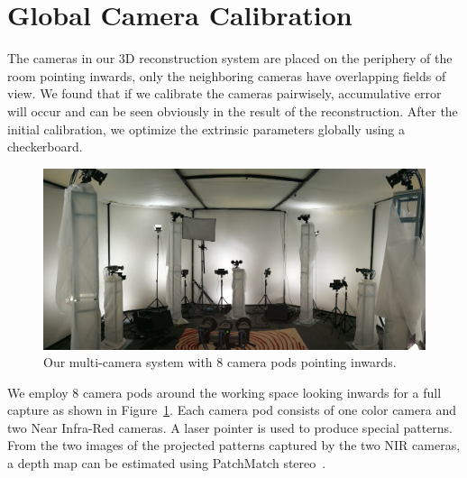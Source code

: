 
\section{Global Camera Calibration}
\label{sec:algorithm}



The cameras in our 3D reconstruction system are placed on the periphery of the room pointing inwards, only the neighboring cameras have overlapping fields of view. We found that if we calibrate the cameras pairwisely, accumulative error will occur and can be seen obviously in the result of the reconstruction.  After the initial calibration,  we optimize the extrinsic parameters globally using a checkerboard.

\begin{figure}[!htp]
\centering
\includegraphics[scale=0.08]{image/rig.jpg}
\caption{Our multi-camera system with 8 camera pods pointing inwards.}
\label{fig:rig}
\end{figure}

We employ 8 camera pods around the working space looking inwards for a full capture as shown in Figure~\ref{fig:rig}. Each camera pod consists of one color camera and two Near Infra-Red cameras. A laser pointer is used to produce special patterns.
From the two images of the projected patterns captured by the two NIR cameras, a depth map can be estimated using PatchMatch
stereo~\cite{Bleyer2011PatchMatch}.


